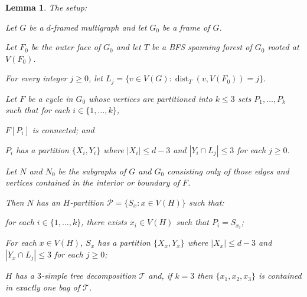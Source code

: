 \documentclass{patmorin}
\theoremstyle{plain}
\newtheorem{lem}[thm]{Lemma}
\theoremstyle{definition}
\newcommand{\note}[2]{\noindent{\color{red}[#1:~#2]}}
\DeclareMathOperator{\dist}{dist}
\newcommand{\PP}{\mathcal{P}}
\renewcommand{\ge}{\geqslant}
\renewcommand{\le}{\leqslant}
\begin{document}
\begin{lem}
	\label{induction} The setup:
	\begin{compactenum}
		\item Let $G$ be a $d$-framed multigraph and let $G_0$ be a frame of $G$.
		\item Let $F_0$ be the outer face of $G_0$ and let $T$ be a BFS spanning forest of $G_0$ rooted at $V(F_0)$.
		\item For every integer $j\ge 0$, let $L_j=\{v\in V(G):\dist_T(v,V(F_0))=j\}$.
		\item Let $F$ be a cycle in $G_0$ whose vertices are partitioned into $k\le 3$ sets $P_1,\ldots,P_k$ such that for each $i\in\{1,\ldots,k\}$,
		\begin{compactenum}
			\item $F[P_i]$ is connected; and
			\item $P_i$ has a partition $\{X_i,Y_i\}$ where $|X_i|\le d-3$ and $|Y_i\cap L_j| \le 3$ for each $j\ge 0$.
		\end{compactenum}
		\item Let $N$ and $N_0$ be the subgraphs of $G$ and $G_0$ consisting only of those edges and vertices contained in the interior or boundary of $F$.
	\end{compactenum}
	Then $N$ has an $H$-partition $\PP=\{S_x: x\in V(H)\}$ such that:
	\begin{compactenum}[(i)]
		\item for each $i\in\{1,\ldots,k\}$, there exists $x_i\in V(H)$ such that $P_i=S_{x_i}$;
		\item For each $x\in V(H)$, $S_x$ has a partition $\{X_x,Y_x\}$ where $|X_x|\le d-3$ and $|Y_x\cap L_j|\le 3$ for each $j\ge 0$;
		\item $H$ has a $3$-simple tree decomposition $\mathcal{T}$ and, if $k=3$ then $\{x_1,x_2,x_3\}$ is contained in exactly one bag of $\mathcal{T}$.
	\end{compactenum}

\end{lem}
\end{document}
